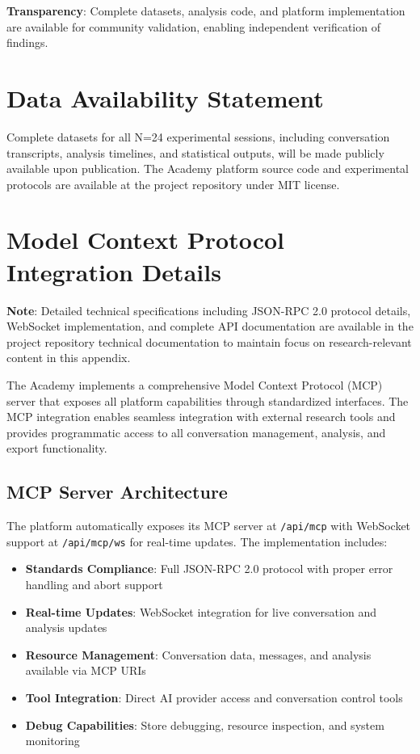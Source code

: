 \documentclass[11pt,letterpaper]{article}
\newcommand{\theacademy}{The Academy}
\newcommand{\exponedataTotalSessionsRaw}{24}
\newcommand{\exponedataTotalSessions}{N=\exponedataTotalSessionsRaw}
\begin{document}
\textbf{Transparency}: Complete datasets, analysis code, and platform implementation are available for community validation, enabling independent verification of findings.

\section*{Data Availability Statement}

Complete datasets for all \exponedataTotalSessions{} experimental sessions, including conversation transcripts, analysis timelines, and statistical outputs, will be made publicly available upon publication. \theacademy{} platform source code and experimental protocols are available at the project repository under MIT license.




\appendix

\section{Model Context Protocol Integration Details}
\label{app:mcp}

\textbf{Note}: Detailed technical specifications including JSON-RPC 2.0 protocol details, WebSocket implementation, and complete API documentation are available in the project repository technical documentation to maintain focus on research-relevant content in this appendix.

\theacademy{} implements a comprehensive Model Context Protocol (MCP) server that exposes all platform capabilities through standardized interfaces. The MCP integration enables seamless integration with external research tools and provides programmatic access to all conversation management, analysis, and export functionality.

\subsection{MCP Server Architecture}

The platform automatically exposes its MCP server at \texttt{/api/mcp} with WebSocket support at \texttt{/api/mcp/ws} for real-time updates. The implementation includes:

\begin{itemize}
    \item \textbf{Standards Compliance}: Full JSON-RPC 2.0 protocol with proper error handling and abort support
    \item \textbf{Real-time Updates}: WebSocket integration for live conversation and analysis updates
    \item \textbf{Resource Management}: Conversation data, messages, and analysis available via MCP URIs
    \item \textbf{Tool Integration}: Direct AI provider access and conversation control tools
    \item \textbf{Debug Capabilities}: Store debugging, resource inspection, and system monitoring
\end{itemize}
\end{document}
